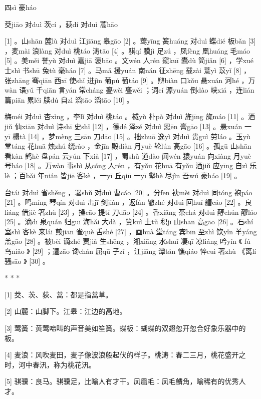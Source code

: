 \documentclass[12pt,UTF8]{ctexbook}
\begin{document}
四sì 豪háo


茭jiāo 对duì 茨cí ，荻dí 对duì 蒿hāo





[1] 。山shān 麓lù 对duì 江jiāng 皋gāo [2] 。莺yīng 簧huáng 对duì 蝶dié 板bǎn [3] ，麦mài 浪làng 对duì 桃táo 涛tāo [4] 。骐qí 骥jì 足zú ，凤fèng 凰huáng 毛máo [5] 。美měi 誉yù 对duì 嘉jiā 褒bāo 。文wén 人rén 窥kuī 蠹dù 简jiǎn [6] ，学xué 士shì 书shū 兔tù 毫háo [7] 。马mǎ 援yuán 南nán 征zhēng 载zài 薏yì 苡yǐ [8] ，张zhāng 骞qiān 西xī 使shǐ 进jìn 葡pú 萄táo [9] 。辩biàn 口kǒu 悬xuán 河hé ，万wàn 语yǔ 千qiān 言yán 常cháng 亹wěi 亹wěi ；词cí 源yuán 倒dào 峡xiá ，连lián 篇piān 累lěi 牍dú 自zì 滔tāo 滔tāo [10] 。

梅méi 对duì 杏xìng ，李lǐ 对duì 桃táo 。棫yù 朴pò 对duì 旌jīng 旄máo [11] 。酒jiǔ 仙xiān 对duì 诗shī 史shǐ [12] ，德dé 泽zé 对duì 恩ēn 膏gāo [13] 。悬xuán 一yī 榻tà [14] ，梦mèng 三sān 刀dāo [15] 。拙zhuō 逸yì 对duì 贵guì 劳láo 。玉yù 堂táng 花huā 烛zhú 绕rào ，金jīn 殿diàn 月yuè 轮lún 高gāo [16] 。孤gū 山shān 看kàn 鹤hè 盘pán 云yún 下xià [17] ，蜀shǔ 道dào 闻wén 猿yuán 向xiàng 月yuè 号háo [18] 。万wàn 事shì 从cóng 人rén ，有yǒu 花huā 有yǒu 酒jiǔ 应yīng 自zì 乐lè ；百bǎi 年nián 皆jiē 客kè ，一yī 丘qiū 一yī 壑hè 尽jìn 吾wú 豪háo [19] 。

台tái 对duì 省shěng ，署shǔ 对duì 曹cáo [20] 。分fēn 袂mèi 对duì 同tóng 袍páo [21] 。鸣míng 琴qín 对duì 击jī 剑jiàn ，返fǎn 辙zhé 对duì 回huí 艚cáo [22] 。良liáng 借jiè 箸zhù [23] ，操cāo 提tí 刀dāo [24] 。香xiāng 茶chá 对duì 醇chún 醪láo [25] 。滴dī 泉quán 归guī 海hǎi 大dà ，篑kuì 土tǔ 积jī 山shān 高gāo [26] 。石shí 室shì 客kè 来lái 煎jiān 雀què 舌shé [27] ，画huà 堂táng 宾bīn 至zhì 饮yǐn 羊yáng 羔gāo [28] 。被bèi 谪zhé 贾jiǎ 生shēng ，湘xiāng 水shuǐ 凄qī 凉liáng 吟yín 《 fú 鸟niǎo 》 [29] ；遭zāo 谗chán 屈qū 子zǐ ，江jiāng 潭tán 憔qiáo 悴cuì 著zhù 《离lí 骚sāo 》 [30] 。



* * *



[1] 茭、茨、荻、蒿：都是指蒿草。

[2] 山麓：山脚下。江皋：江边的高地。

[3] 莺簧：黄莺啼叫的声音美如笙簧。蝶板：蝴蝶的双翅忽开忽合好象乐器中的板。

[4] 麦浪：风吹麦田，麦子像波浪般起伏的样子。桃涛：春二三月，桃花盛开之时，河中春汛，称为桃花汛。

[5] 骐骥：良马。骐骥足，比喻人有才干。凤凰毛：凤毛麟角，喻稀有的优秀人才。
\end{document}
